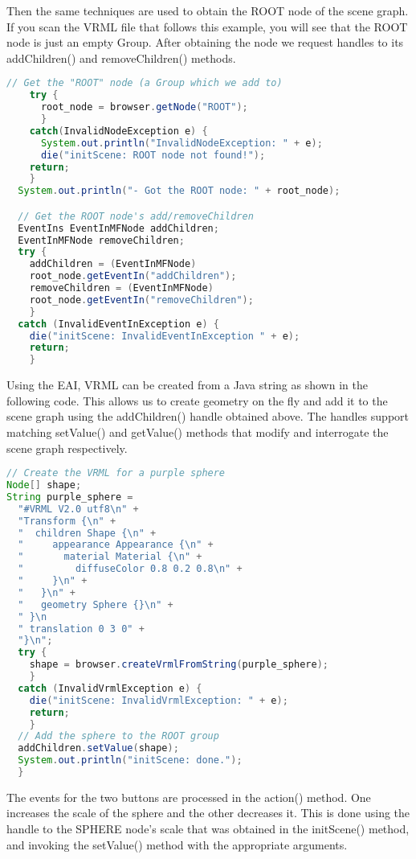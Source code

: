 Then the same techniques are used to obtain the ROOT node of the scene graph. If you scan the VRML file that follows this example, you will see that the ROOT node is just an empty Group. After obtaining the node we request handles to its addChildren() and removeChildren() methods.

\begin{lstlisting}[language=Java, caption={}, numbers=none, frame=none]
    // Get the "ROOT" node (a Group which we add to)
    try {
      root_node = browser.getNode("ROOT");
      }
    catch(InvalidNodeException e) {
      System.out.println("InvalidNodeException: " + e);
      die("initScene: ROOT node not found!");
    return;
    }
  System.out.println("- Got the ROOT node: " + root_node);

  // Get the ROOT node's add/removeChildren
  EventIns EventInMFNode addChildren;
  EventInMFNode removeChildren;
  try {
    addChildren = (EventInMFNode)
    root_node.getEventIn("addChildren");
    removeChildren = (EventInMFNode)
    root_node.getEventIn("removeChildren");
    }
  catch (InvalidEventInException e) {
    die("initScene: InvalidEventInException " + e);
    return;
    }
\end{lstlisting}

Using the EAI, VRML can be created from a Java string as shown in the following code. This allows us to create geometry on the fly and add it to the scene graph using the addChildren() handle obtained above. The handles support matching setValue() and getValue() methods that modify and interrogate the scene graph respectively.

\begin{lstlisting}[language=Java, caption={}, numbers=none, frame=none]
// Create the VRML for a purple sphere
Node[] shape;
String purple_sphere =
  "#VRML V2.0 utf8\n" +
  "Transform {\n" +
  "  children Shape {\n" +
  "     appearance Appearance {\n" +
  "       material Material {\n" +
  "         diffuseColor 0.8 0.2 0.8\n" +
  "     }\n" +
  "   }\n" +
  "   geometry Sphere {}\n" +
  " }\n
  " translation 0 3 0" +
  "}\n";
  try {
    shape = browser.createVrmlFromString(purple_sphere);
    }
  catch (InvalidVrmlException e) {
    die("initScene: InvalidVrmlException: " + e);
    return;
    }
  // Add the sphere to the ROOT group
  addChildren.setValue(shape);
  System.out.println("initScene: done.");
  }
\end{lstlisting}

The events for the two buttons are processed in the action() method. One increases the scale of the sphere and the other decreases it. This is done using the handle to the SPHERE node's scale that was obtained in the initScene() method, and invoking the setValue() method with the appropriate arguments.

